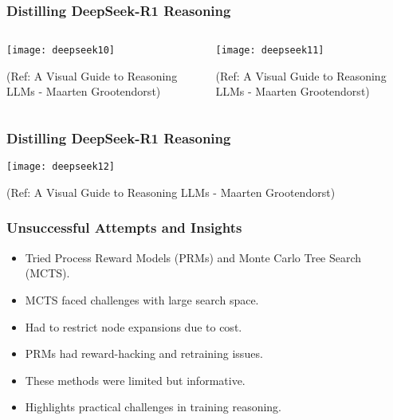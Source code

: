 \begin{frame}[fragile]\frametitle{Distilling DeepSeek-R1 Reasoning}
\begin{columns}
    \begin{column}[T]{0.5\linewidth}
        \begin{center}
        \texttt{[image: deepseek10]}
		
		{\tiny (Ref: A Visual Guide to Reasoning LLMs - Maarten Grootendorst)}
		
        \end{center} 
    \end{column}
    \begin{column}[T]{0.5\linewidth}
        \begin{center}
        \texttt{[image: deepseek11]}
		
		{\tiny (Ref: A Visual Guide to Reasoning LLMs - Maarten Grootendorst)}
		
        \end{center}    
    \end{column}
  \end{columns}
\end{frame}


\begin{frame}[fragile]\frametitle{Distilling DeepSeek-R1 Reasoning}

        \begin{center}
        \texttt{[image: deepseek12]}
		
		{\tiny (Ref: A Visual Guide to Reasoning LLMs - Maarten Grootendorst)}
		
        \end{center} 

\end{frame}
\begin{frame}[fragile]\frametitle{Unsuccessful Attempts and Insights}

      \begin{itemize}
        \item Tried Process Reward Models (PRMs) and Monte Carlo Tree Search (MCTS).
        \item MCTS faced challenges with large search space.
        \item Had to restrict node expansions due to cost.
        \item PRMs had reward-hacking and retraining issues.
        \item These methods were limited but informative.
        \item Highlights practical challenges in training reasoning.
      \end{itemize}

\end{frame}

